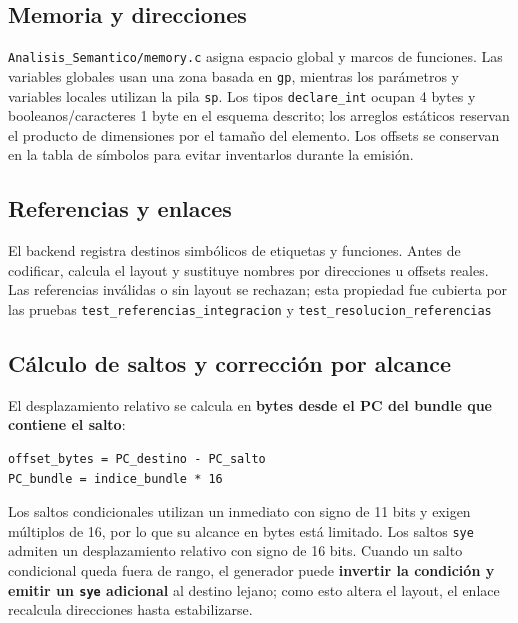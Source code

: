 \subsection{Memoria y
direcciones}\label{55-memoria-y-direcciones}

\texttt{Analisis\_Semantico/memory.c} asigna espacio
global y marcos de funciones. Las variables globales usan una zona
basada en \texttt{gp}, mientras los parámetros y
variables locales utilizan la pila \texttt{sp}. Los
tipos \texttt{declare\_int} ocupan 4 bytes y
booleanos/caracteres 1 byte en el esquema descrito; los arreglos
estáticos reservan el producto de dimensiones por el tamaño del
elemento. Los offsets se conservan en la tabla de símbolos para evitar
inventarlos durante la emisión.

\subsection{Referencias y
enlaces}\label{56-referencias-y-enlaces}

El backend registra destinos simbólicos de etiquetas y funciones. Antes
de codificar, calcula el layout y sustituye nombres por direcciones u
offsets reales. Las referencias inválidas o sin layout se rechazan; esta
propiedad fue cubierta por las pruebas
\texttt{test\_referencias\_integracion} y
\texttt{test\_resolucion\_referencias}

\subsection{Cálculo de saltos y corrección por
alcance}\label{57-calculo-de-saltos-y-correcion-por-alcance}

El desplazamiento relativo se calcula en \textbf{bytes desde el PC del
bundle que contiene el salto}:

\begin{lstlisting}
offset_bytes = PC_destino - PC_salto
PC_bundle = indice_bundle * 16
\end{lstlisting}

Los saltos condicionales utilizan un inmediato con signo de 11 bits y
exigen múltiplos de 16, por lo que su alcance en bytes está limitado.
Los saltos \texttt{sye} admiten un desplazamiento
relativo con signo de 16 bits. Cuando un salto condicional queda fuera
de rango, el generador puede \textbf{invertir la condición y emitir un
\texttt{sye} adicional} al destino lejano; como esto
altera el layout, el enlace recalcula direcciones hasta estabilizarse.

